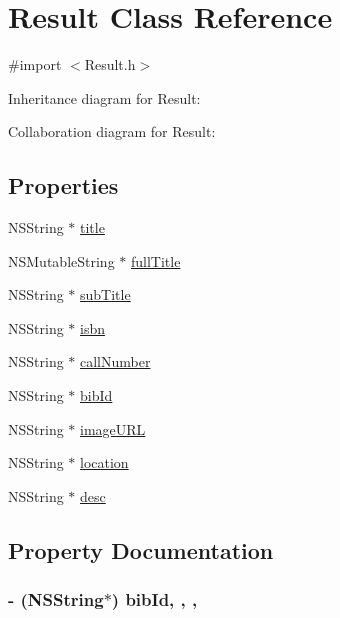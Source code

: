 \hypertarget{interface_result}{}\section{Result Class Reference}
\label{interface_result}


{\ttfamily \#import $<$Result.\+h$>$}



Inheritance diagram for Result\+:


Collaboration diagram for Result\+:
\subsection*{Properties}
\begin{DoxyCompactItemize}
\item 
N\+S\+String $\ast$ \hyperlink{interface_result_a221a82d22ef456d6a35cf6d74802b262}{title}
\item 
N\+S\+Mutable\+String $\ast$ \hyperlink{interface_result_ae0ee8bca9a5152da9dadaaa6e87df815}{full\+Title}
\item 
N\+S\+String $\ast$ \hyperlink{interface_result_a4762f86f65f843c100a26838b8b901d4}{sub\+Title}
\item 
N\+S\+String $\ast$ \hyperlink{interface_result_a986030e775d3d57737a1cbdd08415efc}{isbn}
\item 
N\+S\+String $\ast$ \hyperlink{interface_result_a5e884192413fb61453b6157c61580d37}{call\+Number}
\item 
N\+S\+String $\ast$ \hyperlink{interface_result_a5954ccfa6df362fda75ec5f276d2f16d}{bib\+Id}
\item 
N\+S\+String $\ast$ \hyperlink{interface_result_a0b86d59eecde1e63af6212fe878c9c2e}{image\+U\+R\+L}
\item 
N\+S\+String $\ast$ \hyperlink{interface_result_af3b3c099477d3b115685206a8431aae2}{location}
\item 
N\+S\+String $\ast$ \hyperlink{interface_result_ac14c9c42e2ab672d0ec95253f47f9a6b}{desc}
\end{DoxyCompactItemize}


\subsection{Property Documentation}
\hypertarget{interface_result_a5954ccfa6df362fda75ec5f276d2f16d}{}
\subsubsection[{bib\+Id}]{\setlength{\rightskip}{0pt plus 5cm}-\/ (N\+S\+String$\ast$) bib\+Id\hspace{0.3cm}{\ttfamily [read]}, {\ttfamily [write]}, {\ttfamily [nonatomic]}, {\ttfamily [strong]}}\label{interface_result_a5954ccfa6df362fda75ec5f276d2f16d}
\hypertarget{interface_result_a5e884192413fb61453b6157c61580d37}{}
